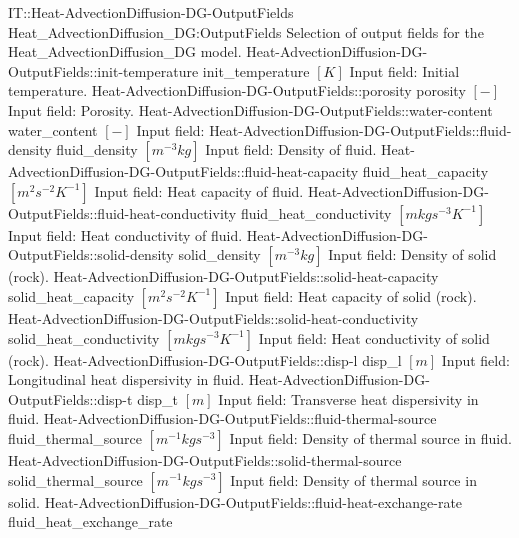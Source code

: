 \begin{SelectionType}
	{IT::Heat-AdvectionDiffusion-DG-OutputFields}
	{Heat{\_}AdvectionDiffusion{\_}DG:OutputFields}
	{{{Selection of output fields for the Heat{\_}AdvectionDiffusion{\_}DG model.}%
}}
		\SelectionItem
			{Heat-AdvectionDiffusion-DG-OutputFields::init-temperature}
			{init{\_}temperature}
			{{{}{$[K]$}{ Input field: Initial temperature.}%
}}
		\SelectionItem
			{Heat-AdvectionDiffusion-DG-OutputFields::porosity}
			{porosity}
			{{{}{$[-]$}{ Input field: Porosity.}%
}}
		\SelectionItem
			{Heat-AdvectionDiffusion-DG-OutputFields::water-content}
			{water{\_}content}
			{{{}{$[-]$}{ Input field: }%
}}
		\SelectionItem
			{Heat-AdvectionDiffusion-DG-OutputFields::fluid-density}
			{fluid{\_}density}
			{{{}{$[m^{-3}kg]$}{ Input field: Density of fluid.}%
}}
		\SelectionItem
			{Heat-AdvectionDiffusion-DG-OutputFields::fluid-heat-capacity}
			{fluid{\_}heat{\_}capacity}
			{{{}{$[m^{2}s^{-2}K^{-1}]$}{ Input field: Heat capacity of fluid.}%
}}
		\SelectionItem
			{Heat-AdvectionDiffusion-DG-OutputFields::fluid-heat-conductivity}
			{fluid{\_}heat{\_}conductivity}
			{{{}{$[mkgs^{-3}K^{-1}]$}{ Input field: Heat conductivity of fluid.}%
}}
		\SelectionItem
			{Heat-AdvectionDiffusion-DG-OutputFields::solid-density}
			{solid{\_}density}
			{{{}{$[m^{-3}kg]$}{ Input field: Density of solid (rock).}%
}}
		\SelectionItem
			{Heat-AdvectionDiffusion-DG-OutputFields::solid-heat-capacity}
			{solid{\_}heat{\_}capacity}
			{{{}{$[m^{2}s^{-2}K^{-1}]$}{ Input field: Heat capacity of solid (rock).}%
}}
		\SelectionItem
			{Heat-AdvectionDiffusion-DG-OutputFields::solid-heat-conductivity}
			{solid{\_}heat{\_}conductivity}
			{{{}{$[mkgs^{-3}K^{-1}]$}{ Input field: Heat conductivity of solid (rock).}%
}}
		\SelectionItem
			{Heat-AdvectionDiffusion-DG-OutputFields::disp-l}
			{disp{\_}l}
			{{{}{$[m]$}{ Input field: Longitudinal heat dispersivity in fluid.}%
}}
		\SelectionItem
			{Heat-AdvectionDiffusion-DG-OutputFields::disp-t}
			{disp{\_}t}
			{{{}{$[m]$}{ Input field: Transverse heat dispersivity in fluid.}%
}}
		\SelectionItem
			{Heat-AdvectionDiffusion-DG-OutputFields::fluid-thermal-source}
			{fluid{\_}thermal{\_}source}
			{{{}{$[m^{-1}kgs^{-3}]$}{ Input field: Density of thermal source in fluid.}%
}}
		\SelectionItem
			{Heat-AdvectionDiffusion-DG-OutputFields::solid-thermal-source}
			{solid{\_}thermal{\_}source}
			{{{}{$[m^{-1}kgs^{-3}]$}{ Input field: Density of thermal source in solid.}%
}}
		\SelectionItem
			{Heat-AdvectionDiffusion-DG-OutputFields::fluid-heat-exchange-rate}
			{fluid{\_}heat{\_}exchange{\_}rate}

\end{SelectionType}
